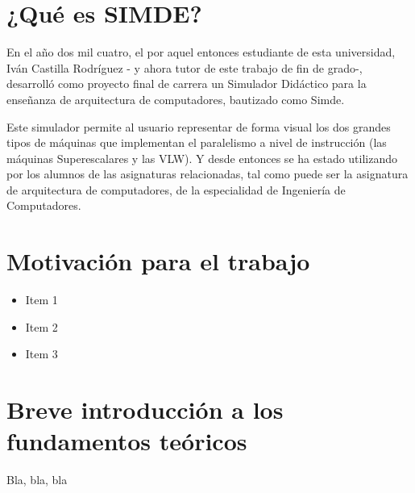 
\section{¿Qué es SIMDE?}
\label{1:sec:1}

En el año dos mil cuatro, el por aquel entonces estudiante de esta universidad, 
Iván Castilla Rodríguez - y ahora tutor de este trabajo de fin de grado-, 
desarrolló como proyecto final de carrera un Simulador Didáctico para la enseñanza 
de arquitectura de computadores, bautizado como Simde. 

Este simulador permite al usuario representar de forma visual los dos grandes tipos 
de máquinas que implementan el paralelismo a nivel de instrucción (las máquinas 
Superescalares y las VLW). Y desde entonces se ha estado utilizando por los alumnos 
de las asignaturas relacionadas, tal como puede ser la asignatura de arquitectura de 
computadores, de la especialidad de Ingeniería de Computadores.

\section{Motivación para el trabajo}
\label{1:sec:2}

\begin{itemize}
  \item Item 1
  \item Item 2
  \item Item 3
\end{itemize}

\section{Breve introducción a los fundamentos teóricos}
\label{1:sec:3}

Bla, bla, bla

